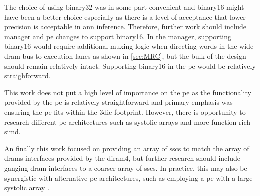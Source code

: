 The choice of using \ac{binary32} was in some part convenient and \ac{binary16} might have been a better choice especially as there is a level of acceptance that lower precision is acceptable in \ac{ann} inference.
Therefore, further work should include manager and \ac{pe} changes to support \ac{binary16}.
In the manager, supporting \ac{binary16} would require additional muxing logic when directing words in the wide \ac{dram} bus to execution lanes as shown in \ref{sec:MRC}, but the bulk of the design should remain relatively intact.
Supporting \ac{binary16} in the \ac{pe} would be relatively straighforward.

This work does not put a high level of importance on the \ac{pe} as the functionality provided by the \ac{pe} is relatively straightforward and primary emphasis was ensuring the \ac{pe} fits within the \ac{3dic} footprint.
However, there is opportunity to research different \ac{pe} architectures such as systolic arrays and more function rich \ac{simd}.

An finally this work focused on providing an array of \acp{ssc} to match the array of \acp{dram} interfaces provided by the \ac{diram4}, but further research should include ganging \ac{dram} interfaces to a coarser array of \acp{ssc}.
In practice, this may also be synergistic with alternative \ac{pe} architectures, such as employing a \ac{pe} with a large systolic array \cite{tensorflow2015-whitepaper}.

\iffalse
  \item Half-Precision PE
  \item Additional PE pipelining
  \item Systolic PE
\fi


